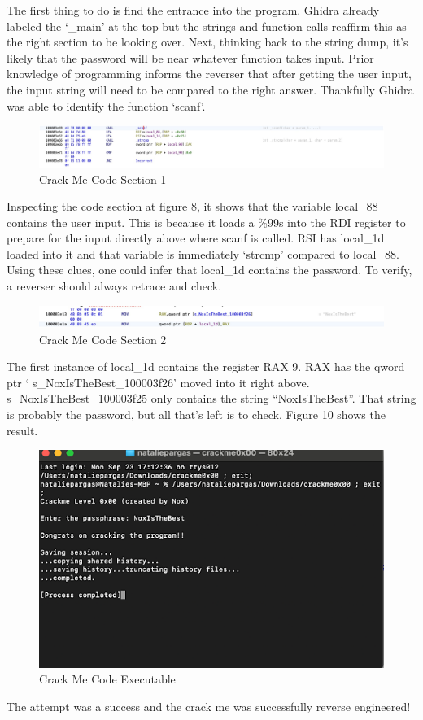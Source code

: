 The first thing to do is find the entrance into the program. 
Ghidra already labeled the ‘\_main’ at the top but the strings and function calls reaffirm this as the right section to be looking over. 
Next, thinking back to the string dump, it’s likely that the password will be near whatever function takes input. 
Prior knowledge of programming informs the reverser that after getting the user input, the input string will need to be compared to the right answer. 
Thankfully Ghidra was able to identify the function ‘scanf’.

\begin{figure}[h]
	\caption{Crack Me Code Section 1}
	\includegraphics[scale=.3]{crackmescanf.png}
\end{figure}

Inspecting the code section at figure 8, it shows that the variable local\_88 contains the user input. 
This is because it loads a \%99s into the RDI register to prepare for the input directly above where scanf is called. 
RSI has local\_1d loaded into it and that variable is immediately ‘strcmp’ compared to local\_88. Using these clues, one could infer that local\_1d contains the password. 
To verify, a reverser should always retrace and check.

\begin{figure}[h]
	\caption{Crack Me Code Section 2}
	\includegraphics[scale=.3]{crackmeRAX.png}
\end{figure}

The first instance of local\_1d contains the register RAX 9. 
RAX has the qword ptr ‘ s\_NoxIsTheBest\_100003f26’ moved into it right above. 
s\_NoxIsTheBest\_100003f25 only contains the string “NoxIsTheBest”. 
That string is probably the password, but all that’s left is to check. 
Figure 10 shows the result.
\clearpage
\begin{figure}[h!]
	\caption{Crack Me Code Executable}
	\includegraphics[]{crackmeexe.png}
\end{figure}
The attempt was a success and the crack me was successfully reverse engineered!

